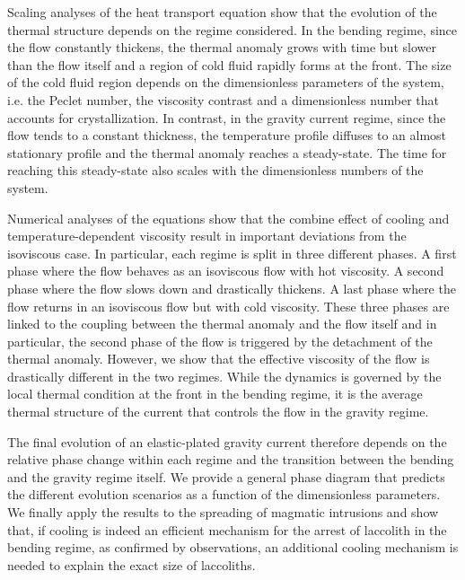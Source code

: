 Scaling  analyses  of  the  heat  transport  equation  show  that  the
evolution   of   the  thermal   structure   depends   on  the   regime
considered. In the bending regime, since the flow constantly thickens,
the thermal  anomaly grows with time  but slower than the  flow itself
and a region  of cold fluid rapidly  forms at the front.   The size of
the cold fluid  region depends on the dimensionless  parameters of the
system,  i.e.   the  Peclet  number,  the  viscosity  contrast  and  a
dimensionless number that accounts  for crystallization.  In contrast,
in the  gravity current  regime, since  the flow  tends to  a constant
thickness, the  temperature profile  diffuses to an  almost stationary
profile and the thermal anomaly  reaches a steady-state.  The time for
reaching this steady-state also  scales with the dimensionless numbers
of the system.

Numerical analyses  of the equations  show that the combine  effect of
cooling  and  temperature-dependent   viscosity  result  in  important
deviations from  the isoviscous case.   In particular, each  regime is
split in three different phases. A  first phase where the flow behaves
as an  isoviscous flow with hot  viscosity.  A second phase  where the
flow slows down and drastically thickens.  A last phase where the flow
returns in  an isoviscous flow  but with cold viscosity.   These three
phases are linked to the coupling  between the thermal anomaly and the
flow  itself and  in  particular,  the second  phase  of  the flow  is
triggered by the detachment of  the thermal anomaly.  However, we show
that the effective  viscosity of the flow is  drastically different in
the two regimes.  While the dynamics  is governed by the local thermal
condition  at the  front  in the  bending regime,  it  is the  average
thermal structure of the current that controls the flow in the gravity
regime.

The  final evolution  of an  elastic-plated gravity  current therefore
depends  on the  relative  phase  change within  each  regime and  the
transition  between the  bending and  the gravity  regime itself.   We
provide a general phase diagram  that predicts the different evolution
scenarios as a  function of the dimensionless  parameters.  We finally
apply the  results to  the spreading of  magmatic intrusions  and show
that, if  cooling is indeed an  efficient mechanism for the  arrest of
laccolith  in the  bending regime,  as confirmed  by observations,  an
additional cooling  mechanism is needed  to explain the exact  size of
laccoliths.


